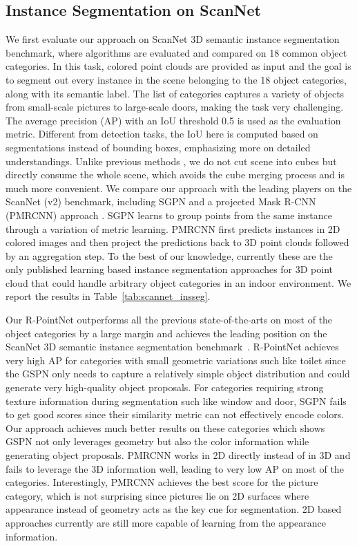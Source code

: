 \documentclass[10pt,twocolumn,letterpaper]{article}
\begin{document}
\subsection{Instance Segmentation on ScanNet}
We first evaluate our approach on ScanNet 3D semantic instance segmentation benchmark, where algorithms are evaluated and compared on 18 common object categories. In this task, colored point clouds are provided as input and the goal is to segment out every instance in the scene belonging to the 18 object categories, along with its semantic label. The list of categories captures a variety of objects from small-scale pictures to large-scale doors, making the task very challenging. The average precision (AP) with an IoU threshold 0.5 is used as the evaluation metric. Different from detection tasks, the IoU here is computed based on segmentations instead of bounding boxes, emphasizing more on detailed understandings. Unlike previous methods \cite{qi2017pointnet,wang2018sgpn}, we do not cut scene into cubes but directly consume the whole scene, which avoids the cube merging process and is much more convenient. We compare our approach with the leading players on the ScanNet (v2) benchmark, including SGPN \cite{wang2018sgpn} and a projected Mask R-CNN (PMRCNN) approach \cite{scannetbenchmark}. SGPN learns to group points from the same instance through a variation of metric learning. PMRCNN first predicts instances in 2D colored images and then project the predictions back to 3D point clouds followed by an aggregation step. To the best of our knowledge, currently these are the only published learning based instance segmentation approaches for 3D point cloud that could handle arbitrary object categories in an indoor environment. We report the results in Table~\ref{tab:scannet_insseg}.

Our R-PointNet outperforms all the previous state-of-the-arts on most of the object categories by a large margin and achieves the leading position on the ScanNet 3D semantic instance segmentation benchmark~\cite{scannetbenchmark}. R-PointNet achieves very high AP for categories with small geometric variations such like toilet since the GSPN only needs to capture a relatively simple object distribution and could generate very high-quality object proposals. For categories requiring strong texture information during segmentation such like window and door, SGPN fails to get good scores since their similarity metric can not effectively encode colors. Our approach achieves much better results on these categories which shows GSPN not only leverages geometry but also the color information while generating object proposals. PMRCNN works in 2D directly instead of in 3D and fails to leverage the 3D information well, leading to very low AP on most of the categories. Interestingly, PMRCNN achieves the best score for the picture category, which is not surprising since pictures lie on 2D surfaces where appearance instead of geometry acts as the key cue for segmentation. 2D based approaches currently are still more capable of learning from the appearance information.
\end{document}
